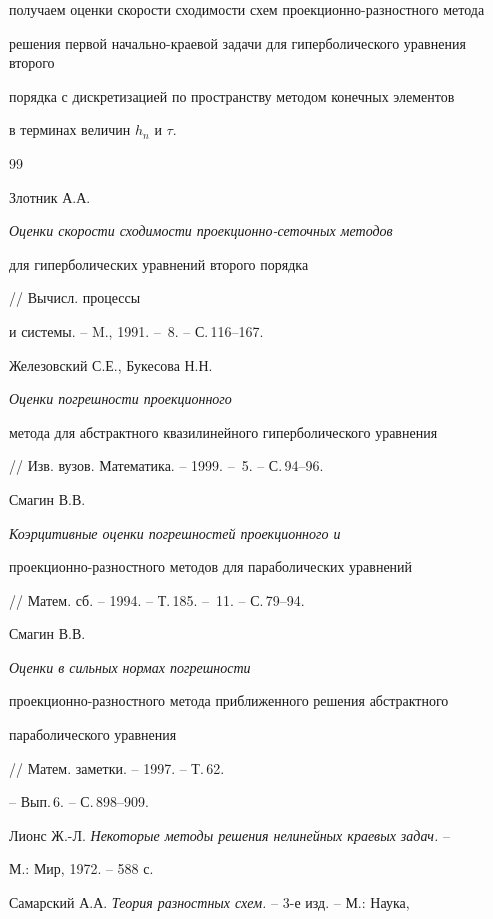 получаем оценки скорости сходимости схем проекционно-разностного метода


решения первой начально-краевой задачи для гиперболического уравнения второго


порядка с дискретизацией по пространству методом конечных элементов


в терминах величин $h_n$ и $\tau$.








\begin{thebibliography}{99}







Злотник А.А. {\it Оценки скорости сходимости проекционно-сеточных методов


для гиперболических уравнений второго порядка} // Вычисл. процессы


и системы. -- M., 1991. -- \No\,8. -- С.\,116--167.




Железовский С.Е., Букесова Н.Н. {\it Оценки погрешности проекционного


метода для абстрактного квазилинейного гиперболического уравнения}


// Изв. вузов. Математика. -- 1999. -- \No\,5. -- С.\,94--96.




Смагин В.В. {\it Коэрцитивные оценки погрешностей проекционного и


проекционно-раз\-ност\-но\-го методов для параболических уравнений}


// Матем. сб. -- 1994. -- Т.\,185. -- \No\,11. -- С.\,79--94.




Смагин В.В. {\it Оценки в сильных нормах погрешности


проекционно-разностного метода приближенного решения абстрактного


параболического уравнения} // Матем. заметки. -- 1997. -- Т.\,62.


-- Вып.\,6. -- С.\,898--909.




Лионс Ж.-Л. {\it Некоторые методы решения нелинейных краевых задач.} --


М.: Мир, 1972. -- 588 с.




Самарский А.А. {\it Теория разностных схем.} -- 3-е изд. -- М.: Наука,



\end{thebibliography}
